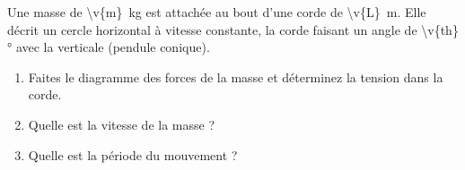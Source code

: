 Une masse de \qty{\v{m}}{kg} est attachée au bout d'une corde de \qty{\v{L}}{m}. Elle décrit un cercle horizontal à vitesse constante, la corde faisant un angle de \ang{\v{th}} avec la verticale (pendule conique).

\begin{center}
\end{center}

\begin{enumerate}[label=\alph*)]
    \item Faites le diagramme des forces de la masse et déterminez la tension dans la corde.
    \item Quelle est la vitesse de la masse ?
    \item Quelle est la période du mouvement ?
\end{enumerate}

